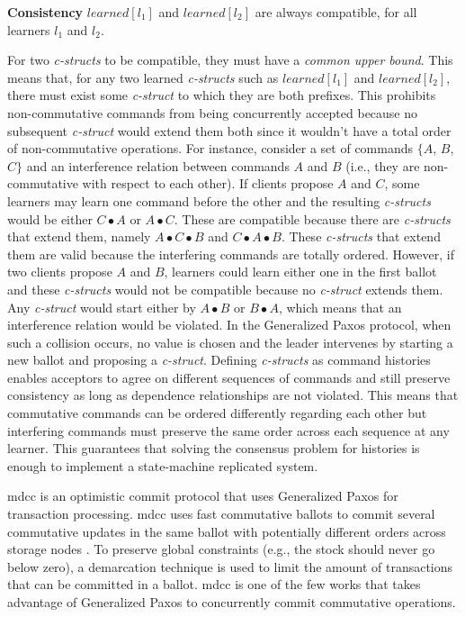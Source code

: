 \textbf{Consistency} $learned[l_1]$ and $learned[l_2]$ are always compatible, for all learners $l_1$ and $l_2$. \par
For two \textit{c-structs} to be compatible, they must have a \textit{common upper bound}. This means that, for any two learned \textit{c-structs} such as $learned[l_1]$ and $learned[l_2]$, there must exist some \textit{c-struct} to which they are both prefixes. This prohibits non-commutative commands from being concurrently accepted because no subsequent \textit{c-struct} would extend them both since it wouldn't have a total order of non-commutative operations. For instance, consider a set of commands $\lbrace A$, $B$, $C\rbrace$ and an interference relation between commands $A$ and $B$ (i.e., they are non-commutative with respect to each other). If clients propose $A$ and $C$, some learners may learn one command before the other and the resulting \textit{c-structs} would be either $C \bullet A$ or $A \bullet C$. These are compatible because there are \textit{c-structs} that extend them, namely $A \bullet C \bullet B$ and $C \bullet A \bullet B$. These \textit{c-structs} that extend them are valid because the interfering commands are totally ordered. However, if two clients propose $A$ and $B$, learners could learn either one in the first ballot and these \textit{c-structs} would not be compatible because no \textit{c-struct} extends them. Any \textit{c-struct} would start either by $A \bullet B$ or $B \bullet A$, which means that an interference relation would be violated. In the Generalized Paxos protocol, when such a collision occurs, no value is chosen and the leader intervenes by starting a new ballot and proposing a \textit{c-struct}. Defining \textit{c-structs} as command histories enables acceptors to agree on different sequences of commands and still preserve consistency as long as dependence relationships are not violated. This means that commutative commands can be ordered differently regarding each other but interfering commands must preserve the same order across each sequence at any learner. This guarantees that solving the consensus problem for histories is enough to implement a state-machine replicated system. \par
\acrfull{mdcc} is an optimistic commit protocol that uses Generalized Paxos for transaction processing. \acrshort{mdcc} uses fast commutative ballots to commit several commutative updates in the same ballot with potentially different orders across storage nodes \cite{Kraska2013}. To preserve global constraints (e.g., the stock should never go below zero), a demarcation technique is used to limit the amount of transactions that can be committed in a ballot. \acrshort{mdcc} is one of the few works that takes advantage of Generalized Paxos to concurrently commit commutative operations.\par
